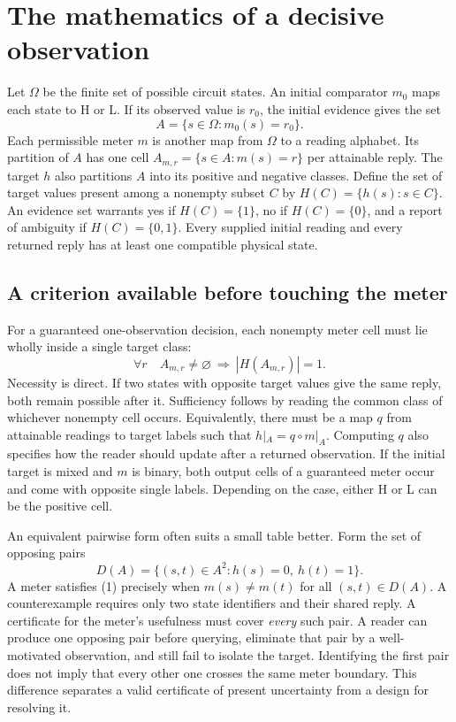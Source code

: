 \documentclass[12pt,letterpaper]{article}
\begin{document}
\section{The mathematics of a decisive observation}

Let $\Omega$ be the finite set of possible circuit states. An initial comparator $m_0$ maps each state to H or L. If its observed value is $r_0$, the initial evidence gives the set
\[
                 A=\{s\in\Omega:m_0(s)=r_0\}.
\]
Each permissible meter $m$ is another map from $\Omega$ to a reading alphabet. Its partition of $A$ has one cell $A_{m,r}=\{s\in A:m(s)=r\}$ per attainable reply. The target $h$ also partitions $A$ into its positive and negative classes. Define the set of target values present among a nonempty subset $C$ by $H(C)=\{h(s):s\in C\}$. An evidence set warrants yes if $H(C)=\{1\}$, no if $H(C)=\{0\}$, and a report of ambiguity if $H(C)=\{0,1\}$. Every supplied initial reading and every returned reply has at least one compatible physical state.

\subsection{A criterion available before touching the meter}

For a guaranteed one-observation decision, each nonempty meter cell must lie wholly inside a single target class:
\[
      \forall r\quad A_{m,r}\ne\varnothing\ \Longrightarrow\ |H(A_{m,r})|=1 .
      \tag{1}
\]
Necessity is direct. If two states with opposite target values give the same reply, both remain possible after it. Sufficiency follows by reading the common class of whichever nonempty cell occurs. Equivalently, there must be a map $q$ from attainable readings to target labels such that $h|_A=q\circ m|_A$. Computing $q$ also specifies how the reader should update after a returned observation. If the initial target is mixed and $m$ is binary, both output cells of a guaranteed meter occur and come with opposite single labels. Depending on the case, either H or L can be the positive cell.

An equivalent pairwise form often suits a small table better. Form the set of opposing pairs
\[
                D(A)=\{(s,t)\in A^2:h(s)=0,\ h(t)=1\}.
\]
A meter satisfies (1) precisely when $m(s)\ne m(t)$ for all $(s,t)\in D(A)$. A counterexample requires only two state identifiers and their shared reply. A certificate for the meter's usefulness must cover \emph{every} such pair. A reader can produce one opposing pair before querying, eliminate that pair by a well-motivated observation, and still fail to isolate the target. Identifying the first pair does not imply that every other one crosses the same meter boundary. This difference separates a valid certificate of present uncertainty from a design for resolving it.
\end{document}
